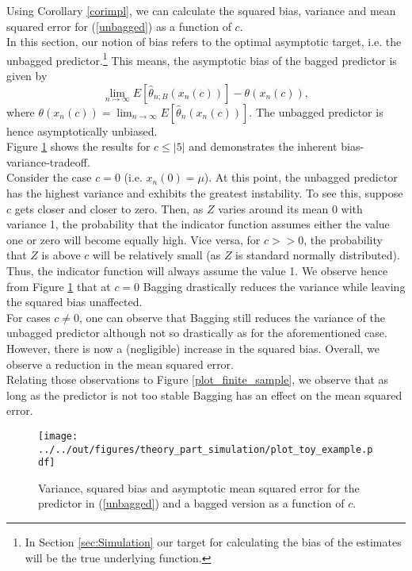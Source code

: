 Using Corollary \ref{corimpl}, we can calculate the squared bias, variance and mean squared error for (\ref{unbagged}) as a function of $c$. \\
In this section, our notion of bias refers to the optimal asymptotic target, i.e. the unbagged predictor.\footnote{In Section \ref{sec:Simulation} our target for calculating the bias of the estimates will be the true underlying function.}
This means, the asymptotic bias of the bagged predictor is given by $$\lim_{n \rightarrow \infty}E[\hat{\theta}_{n;B}(x_{n}(c))] - \theta(x_{n}(c)),$$ where $\theta(x_{n}(c))=\lim_{n \rightarrow \infty}E[\hat{\theta}_{n}(x_{n}(c))]$. The unbagged predictor is hence asymptotically unbiased.\\
Figure \ref{plot_asy} shows the results for $c \leq |5|$ and demonstrates the inherent bias-variance-tradeoff.\\
Consider the case $c=0$ (i.e. $x_{n}(0)=\mu$).
At this point, the unbagged predictor has the highest variance and exhibits the greatest instability.
To see this, suppose $c$ gets closer and closer to zero. Then, as $Z$ varies around its mean 0 with variance 1, the probability that the indicator function assumes either the value one or zero will become equally high.
Vice versa, for $c >>0$, the probability that $Z$ is above  $c$ will be relatively small (as $Z$ is standard normally distributed). Thus, the indicator function will always assume the value 1.
We observe hence from Figure \ref{plot_asy} that at $c=0$ Bagging drastically reduces the variance while leaving the squared bias unaffected.\\
For cases $c \ne 0$, one can observe that Bagging still reduces the variance of the unbagged predictor although not so drastically as for the aforementioned case. However, there is now a (negligible) increase in the squared bias.
Overall, we observe a  reduction in the mean squared error.\\
Relating those observations to Figure \ref{plot_finite_sample}, we observe that as long as the predictor is not too stable Bagging has an effect on the mean squared error.
\begin{figure}[t]
\centering
\texttt{[image: ../../out/figures/theory\_part\_simulation/plot\_toy\_example.pdf]}
\caption[Variance, squared bias and asymptotic mean squared error for the predictor in (\ref{unbagged}) and a bagged version as a function of $c$.]{Variance, squared bias and asymptotic mean squared error for the predictor in (\ref{unbagged}) and a bagged version as a function of $c$.}\label{plot_asy}
\end{figure}

